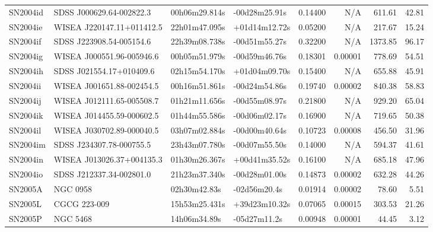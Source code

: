 \begin{longtable}{llllrrrr}
SN2004id         &        SDSS J000629.64-002822.3 &   00h06m29.814s &   -00d28m25.91s &  0.14400 &      N/A &   611.61 &       42.81 \\
SN2004ie         &       WISEA J220147.11+011412.5 &   22h01m47.095s &   +01d14m12.72s &  0.05200 &      N/A &   217.67 &       15.24 \\
SN2004if         &        SDSS J223908.54-005154.6 &   22h39m08.738s &   -00d51m55.27s &  0.32200 &      N/A &  1373.85 &       96.17 \\
SN2004ig         &       WISEA J000551.96-005946.6 &   00h05m51.979s &   -00d59m46.76s &  0.18301 &  0.00001 &   778.69 &       54.51 \\
SN2004ih         &        SDSS J021554.17+010409.6 &   02h15m54.170s &   +01d04m09.70s &  0.15400 &      N/A &   655.88 &       45.91 \\
SN2004ii         &       WISEA J001651.88-002454.5 &   00h16m51.861s &   -00d24m54.86s &  0.19740 &  0.00002 &   840.38 &       58.83 \\
SN2004ij         &       WISEA J012111.65-005508.7 &   01h21m11.656s &   -00d55m08.97s &  0.21800 &      N/A &   929.20 &       65.04 \\
SN2004ik         &       WISEA J014455.59-000602.5 &   01h44m55.586s &   -00d06m02.17s &  0.16900 &      N/A &   719.65 &       50.38 \\
SN2004il         &       WISEA J030702.89-000040.5 &   03h07m02.884s &   -00d00m40.64s &  0.10723 &  0.00008 &   456.50 &       31.96 \\
SN2004im         &        SDSS J234307.78-000755.5 &   23h43m07.780s &   -00d07m55.50s &  0.14000 &      N/A &   594.37 &       41.61 \\
SN2004in         &       WISEA J013026.37+004135.3 &   01h30m26.367s &   +00d41m35.52s &  0.16100 &      N/A &   685.18 &       47.96 \\
SN2004io         &        SDSS J212337.34-002801.0 &   21h23m37.340s &   -00d28m01.00s &  0.14873 &  0.00002 &   632.28 &       44.26 \\
SN2005A          &                        NGC 0958 &    02h30m42.83s &    -02d56m20.4s &  0.01914 &  0.00002 &    78.60 &        5.51 \\
SN2005L          &                    CGCG 223-009 &   15h53m25.431s &   +39d23m10.32s &  0.07065 &  0.00015 &   303.53 &       21.26 \\
SN2005P          &                        NGC 5468 &    14h06m34.89s &    -05d27m11.2s &  0.00948 &  0.00001 &    44.45 &        3.12 \\

\end{longtable}
